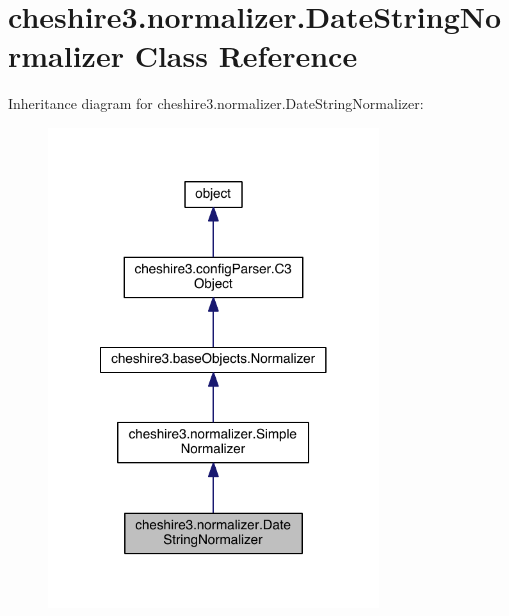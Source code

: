 \hypertarget{classcheshire3_1_1normalizer_1_1_date_string_normalizer}{\section{cheshire3.\-normalizer.\-Date\-String\-Normalizer Class Reference}
\label{classcheshire3_1_1normalizer_1_1_date_string_normalizer}
}


Inheritance diagram for cheshire3.\-normalizer.\-Date\-String\-Normalizer\-:
\nopagebreak
\begin{figure}[H]
\begin{center}
\leavevmode
\includegraphics[width=248pt]{classcheshire3_1_1normalizer_1_1_date_string_normalizer__inherit__graph}
\end{center}
\end{figure}


